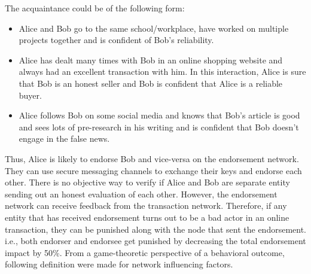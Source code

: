 The acquaintance could be of the following form:
\begin{itemize}
	\item Alice and Bob go to the same school/workplace, have worked on
		multiple projects together and is confident of Bob's reliability.
	\item Alice has dealt many times with Bob in an online shopping website and
		always had an excellent transaction with him. In this interaction,
		Alice is sure that Bob is an honest seller and Bob is confident that
		Alice is a reliable buyer. 
	\item Alice follows Bob on some social media and knows that Bob's
		article is good and sees lots of pre-research in his writing and is
		confident that Bob doesn't engage in the false news.
\end{itemize}
Thus, Alice is likely to endorse Bob and vice-versa on the endorsement network.
They can use secure messaging channels to exchange their keys and endorse each
other. There is no objective way to verify if Alice and Bob are separate entity
sending out an honest evaluation of each other. However, the endorsement
network can receive feedback from the transaction network. Therefore, if any
entity that has received endorsement turns out to be a bad actor in an online
transaction, they can be punished along with the node that sent the
endorsement. i.e., both endorser and endorsee get punished by decreasing the
total endorsement impact by 50\%.
From a game-theoretic perspective of a behavioral outcome, following
definition were made for network influencing factors. 

